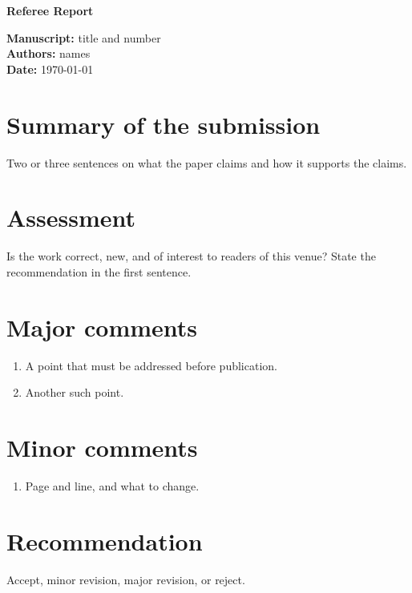 \documentclass[11pt,a4paper]{article}
\begin{document}
{\large \textbf{Referee Report}}

\textbf{Manuscript:} title and number \\
\textbf{Authors:} names \\
\textbf{Date:} \today

\section*{Summary of the submission}
Two or three sentences on what the paper claims and how it supports the claims.

\section*{Assessment}
Is the work correct, new, and of interest to readers of this venue? State the recommendation in the first sentence.

\section*{Major comments}
\begin{enumerate}[leftmargin=1.5em]
  \item A point that must be addressed before publication.
  \item Another such point.
\end{enumerate}

\section*{Minor comments}
\begin{enumerate}[leftmargin=1.5em]
  \item Page and line, and what to change.
\end{enumerate}

\section*{Recommendation}
Accept, minor revision, major revision, or reject.
\end{document}
